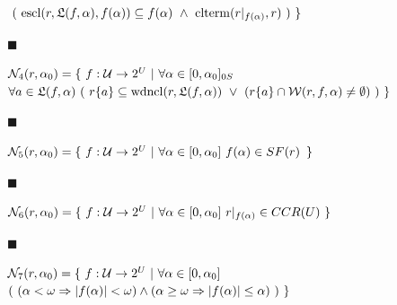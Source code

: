 \documentclass[10pt,a4paper]{amsart}
\begin{document}
 
 
$\leavevmode\nobreak\ (\leavevmode\nobreak\ \mathrm{escl}(r,\mathfrak{L}(f,%
\alpha),f(\alpha))\subseteq f(\alpha)\leavevmode\nobreak\ \wedge\leavevmode%
\nobreak\ \mathrm{clterm}(r|_{f(\alpha)},r)\leavevmode\nobreak\ )\leavevmode%
\nobreak\ \}$\par
 
 
 
\par\noindent  $\blacksquare$ 
 
$\mathcal{N}_{4}(r,\alpha_{0})=\{\leavevmode\nobreak\ f:\mathcal{U}\to 2^{U}%
\leavevmode\nobreak\ |\leavevmode\nobreak\ \forall\alpha\in[0,\alpha_{0}]_{0S}%
\leavevmode\nobreak\ $  $\forall a\in\mathfrak{L}(f,\alpha)\leavevmode\nobreak\ (\leavevmode\nobreak\ r%
\{a\}\subseteq\mathrm{wdncl}(r,\mathfrak{L}(f,\alpha))\leavevmode\nobreak\ %
\vee\leavevmode\nobreak\ (r\{a\}\cap\mathcal{W}(r,f,\alpha)\neq\emptyset)%
\leavevmode\nobreak\ )\leavevmode\nobreak\ \}$\par
 
 
 
\par\noindent  $\blacksquare$ 
 
$\mathcal{N}_{5}(r,\alpha_{0})=\{\leavevmode\nobreak\ f:\mathcal{U}\to 2^{U}%
\leavevmode\nobreak\ |\leavevmode\nobreak\ \forall\alpha\in[0,\alpha_{0}]%
\leavevmode\nobreak\ f(\alpha)\in SF(r)\,\leavevmode\nobreak\ \}$\par
 
 
 
\par\noindent  $\blacksquare$ 
 
$\mathcal{N}_{6}(r,\alpha_{0})=\{\leavevmode\nobreak\ f:\mathcal{U}\to 2^{U}%
\leavevmode\nobreak\ |\leavevmode\nobreak\ \forall\alpha\in[0,\alpha_{0}]%
\leavevmode\nobreak\ r|_{f(\alpha)}\in CCR(U)\leavevmode\nobreak\ \}$\par
 
 
 
\par\noindent  $\blacksquare$ 
 
$\mathcal{N}_{7}(r,\alpha_{0})=\{\leavevmode\nobreak\ f:\mathcal{U}\to 2^{U}%
\leavevmode\nobreak\ |\leavevmode\nobreak\ \forall\alpha\in[0,\alpha_{0}]%
\leavevmode\nobreak\ $  $(\leavevmode\nobreak\ (\alpha<\omega\Rightarrow|f(\alpha)|<\omega)\wedge(%
\alpha\geq\omega\Rightarrow|f(\alpha)|\leq\alpha)\leavevmode\nobreak\ )%
\leavevmode\nobreak\ \}$\par
 
\end{document}
